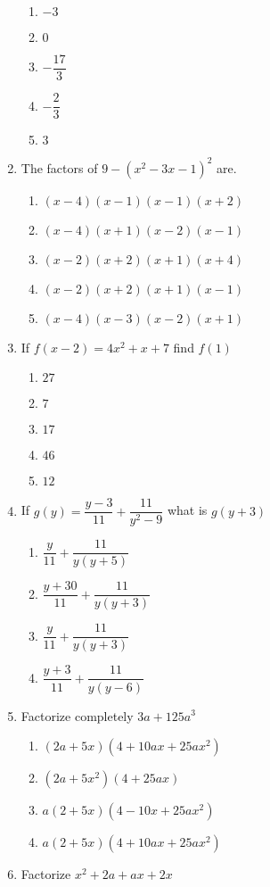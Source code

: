 \begin{multicols}{2}
\begin{enumerate}[label={\arabic*.}]
\begin{enumerate}[label={\Alph*.}]
	\item \(-3\)
	\item \(0\)
	\item \(-\dfrac{17}{3}\)
	\item \(-\dfrac{2}{3}\)
	\item \(3\)
	\end{enumerate}
\item The factors of \(9-({x}^{2}-3x-1)^2\) are. 
	\begin{enumerate}[label={\Alph*.}]
	\item \((x-4)(x-1)(x-1)(x+2)\)
	\item \((x-4)(x+1)(x-2)(x-1)\)
	\item \((x-2)(x+2)(x+1)(x+4)\)
	\item \((x-2)(x+2)(x+1)(x-1)\)
	\item \((x-4)(x-3)(x-2)(x+1)\)
	\end{enumerate}
\item If \(f(x-2) = 4{x}^{2} + x + 7 \) find \(f(1)\)
	\begin{enumerate}[label={\Alph*.}]
	\item \(27\)
	\item \(7\)
	\item \(17\)
	\item \(46\)
	\item \(12\)
	\end{enumerate}
\item If \(g(y) = \dfrac{y - 3}{11} + \dfrac{11}{y^2-9}\) what is \(g(y+3)\)
	\begin{enumerate}[label={\Alph*.}]
	\item \(\dfrac{y}{11} + \dfrac{11}{y(y+5)}\)
	\item \(\dfrac{y+30}{11} + \dfrac{11}{y(y+3)}\)
	\item \(\dfrac{y}{11} + \dfrac{11}{y(y+3)}\)
	\item \(\dfrac{y+3}{11}+\dfrac{11}{y(y-6)}\)
	\end{enumerate}
\item Factorize completely \(3a+125a^3\)
	\begin{enumerate}[label={\Alph*.}]
	\item \((2a+5x)(4+10ax + 25a{x}^{2})\)
	\item \((2a+5{x}^{2})(4+25ax)\)
	\item \(a(2+5x)(4-10x+25a{x}^{2})\)
	\item \(a(2+5x)(4+10ax+25a{x}^{2})\)
	\end{enumerate}
\item Factorize \({x}^{2}+2a+ax+2x\)

\end{enumerate}
\end{multicols}
